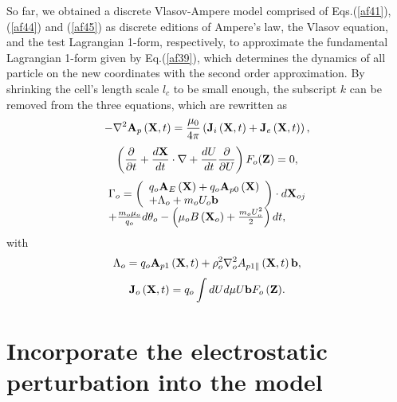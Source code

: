 \documentclass[12pt]{iopart}
\begin{document}
So far, we obtained a discrete Vlasov-Ampere model comprised of Eqs.(\ref{af41}),(\ref{af44}) and (\ref{af45}) as discrete editions of Ampere's law, the Vlasov equation, and the test Lagrangian 1-form, respectively, to approximate the fundamental Lagrangian 1-form given by Eq.(\ref{af39}), which determines the dynamics of all particle on the new coordinates with the second order approximation.  By shrinking the cell's length scale $l_c$ to be small enough, the subscript $k$ can be removed from the three equations, which are rewritten as
\begin{equation}\label{af47}
- {\nabla ^2}{{\bf{A}}_p}\left( {{\bf{X}},t} \right) = \frac{{{\mu _0}}}{{4\pi }}\left( {{{\bf{J}}_i}\left( {{\bf{X}},t} \right) + {{\bf{J}}_e}\left( {{\bf{X}},t} \right)} \right),
\end{equation}
\begin{equation}\label{af48}
\left( {\frac{\partial }{{\partial t}} + \frac{{d{\bf{X}}}}{{dt}}\cdot\nabla  + \frac{{dU}}{{dt}}\frac{\partial }{{\partial U}}} \right){F_o}({\bf{Z}}) = 0,
\end{equation}
\begin{equation}\label{af49}
\begin{array}{*{20}{l}}
{{\Gamma _o} = \left( {\begin{array}{*{20}{l}}
{{q_o}{{\bf{A}}_E}\left( {\bf{X}} \right) + {q_o}{{\bf{A}}_{p0}}\left( {\bf{X}} \right)}\\
{ + {\Lambda _o} + {m_o}{U_o}{\bf{b}}}
\end{array}} \right)\cdot d{{\bf{X}}_{oj}}}\\
{ + \frac{{{m_o}{\mu _o}}}{{{q_o}}}d{\theta _o} - \left( {{\mu _o}B\left( {{{\bf{X}}_o}} \right) + \frac{{{m_o}U_o^2}}{2}} \right)dt,}
\end{array}
\end{equation}
with
\begin{equation}\label{af50}
{\Lambda _o} = {q_o}{{\bf{A}}_{p1}}\left( {{\bf{X}},t} \right) + \rho _o^2\nabla _o^2{A_{p1\parallel }}\left( {{\bf{X}},t} \right){\bf{b}},
\end{equation}
\begin{equation}\label{af51}
{{\bf{J}}_o}\left( {{\bf{X}},t} \right) = {q_o}\int {dUd\mu U{\bf{b}}{F_o}\left( {\bf{Z}} \right)}.
\end{equation}

\section{Incorporate the electrostatic perturbation into the model}\label{sec5}
\end{document}
